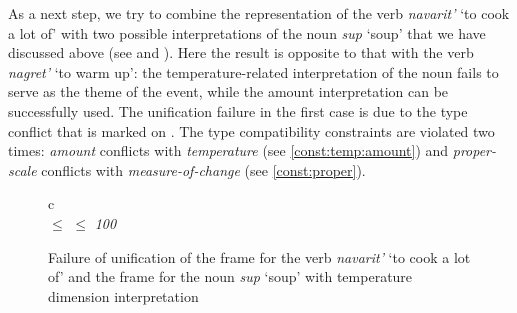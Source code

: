 As a next step, we try to combine the representation of the verb \textit{navarit'} `to cook a lot of' with two possible interpretations of the noun \textit{sup} `soup' that we have discussed above (see  and ). Here the result is opposite to that with the verb \textit{nagret'} `to warm up': the temperature-related interpretation of the noun fails to serve as the theme of the event, while the amount interpretation can be successfully used. The unification failure in the first case is due to the type conflict that is marked on . The type compatibility constraints are violated two times: \textit{amount} conflicts with \textit{temperature} (see \ref{const:temp:amount}) and \textit{proper-scale} conflicts with \textit{measure-of-change} (see \ref{const:proper}).

\begin{figure}
\begin{tabular}{c}
\\
 $\leq$  $\leq$ \textit{100}
\end{tabular}
\caption{Failure of unification of the frame for the verb \textit{navarit'} `to cook a lot of' and the frame for the noun \textit{sup} `soup' with temperature dimension interpretation \label{frame:navarit:soup:temp}}
\end{figure}

